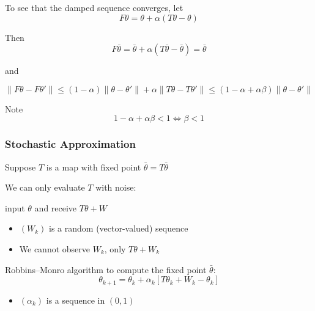 \documentclass[xcolor=dvipsnames]{beamer}  %
\renewcommand{\leq}{\leqslant}
\newcommand{\1}{\mathbbm 1}
\begin{document}
\begin{frame}

    To see that the damped sequence converges, let
    \begin{equation*}
        F\theta = \theta + \alpha (T\theta - \theta)
    \end{equation*}

    Then
    \begin{equation*}
        F \bar \theta 
        = \bar \theta + \alpha (T \bar \theta - \bar \theta)
        = \bar \theta
    \end{equation*}

    and

    \begin{equation*}
        \| F\theta - F\theta'\|
        \leq (1-\alpha)\|\theta - \theta'\| + \alpha \| T\theta - T\theta'\|
        \leq (1-\alpha + \alpha \beta)\| \theta - \theta'\|
    \end{equation*}

    Note 
    \begin{equation*}
        1-\alpha + \alpha \beta < 1
        \iff \beta < 1
    \end{equation*}
    
\end{frame}

\begin{frame}
    \frametitle{Stochastic Approximation}

    Suppose $T$ is a map with fixed point $\bar \theta = T \bar \theta$

    We can only evaluate $T$ with noise:
    \begin{center}
        input $\theta$ and receive $T \theta + W$ 
    \end{center}

    \begin{itemize}
        \item $(W_k)$ is a random (vector-valued) sequence 
        \item We cannot observe $W_k$, only $T \theta + W_k$
    \end{itemize}

    Robbins--Monro algorithm to compute the fixed point $\bar \theta$:
    \begin{equation*}
        \theta_{k+1} 
        = \theta_k + \alpha_k [ T \theta_k + W_k - \theta_k ]
    \end{equation*}

    \begin{itemize}
        \item $(\alpha_k)$ is a sequence in $(0,1)$
    \end{itemize}

\end{frame}
\end{document}
